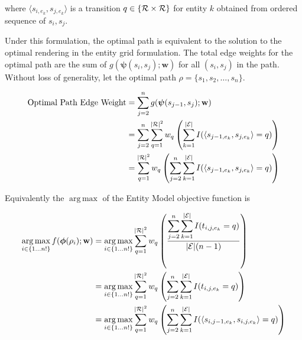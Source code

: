 \documentclass{article}
\newcommand{\entities}{{\cal E}}
\newcommand{\ent}{e}
\newcommand{\roles}{{\cal R}}
\newcommand{\tv}{t}
\newcommand{\sent}{s}
\newcommand{\weight}{\mathbf{w}}
\newcommand{\rend}{\rho}
\newcommand{\Rend}{{\cal P}}
\newcommand{\trans}{q}
\newcommand{\obj}{f}
\newcommand{\EnumS}[2]{\{#1 \ldots #2\}}
\DeclareMathOperator*{\argmax}{arg\,max}
\newcommand{\fmap}{\boldsymbol{\phi}}
\newcommand{\edgeTot}{\boldsymbol{\psi}}
\begin{document}
where $\langle \sent_{i,\ent_k},\sent_{j,\ent_k} \rangle$ is a transition $q \in \{\roles \times \roles\}$ for entity $k$  obtained from ordered sequence of $\sent_i,\sent_j$.


Under this formulation, the optimal path is equivalent to the solution to the optimal rendering in the entity grid formulation. 
The total edge weights for the optimal path are the sum of $g(\edgeTot(\sent_i,\sent_j);\weight)$ for all $(\sent_i,\sent_j)$ in the path.
Without loss of generality, let the optimal path $\rend = \{ \sent_1,\sent_2,\ldots,\sent_n \}$.

\begin{equation*}
\begin{split}
\textrm{Optimal Path Edge Weight} &= \sum^{n}_{j=2} g(\edgeTot(\sent_{j-1},\sent_j );\weight) \\
& = \sum^n_{j=2} \sum^{|\roles|^2}_{\trans=1} w_\trans \left( \sum_{k = 1}^{|\entities|} I(\langle \sent_{j-1,\ent_k},\sent_{j,\ent_k}\rangle = \trans)  \right)\\
& = \sum^{|\roles|^2}_{\trans=1} w_\trans \left( \sum^n_{j=2}  \sum_{k = 1}^{|\entities|} I(\langle \sent_{j-1,\ent_k},\sent_{j,\ent_k}\rangle = \trans)  \right)\\
\end{split}
\end{equation*}

Equivalently the $\argmax$ of the Entity Model objective function is


\begin{equation*}
\begin{split}
    \argmax_{i \in \EnumS{1}{n!}} \obj(\fmap(\rend_i) ; \weight ) &= \argmax_{i \in \EnumS{1}{n!}} \sum^{|\roles|^2}_{\trans=1} w_\trans \left(  \frac{ \displaystyle \sum_{j = 2}^n \sum_{k=1}^{|\entities|} I(\tv_{i,j,e_k}= \trans)  }{|\entities|(n-1)} \right)\\    
    &= \argmax_{i \in \EnumS{1}{n!}} \sum^{|\roles|^2}_{\trans=1} w_\trans \left( \displaystyle \sum_{j = 2}^n \sum_{k=1}^{|\entities|} I(\tv_{i,j,e_k}= \trans)\right)\\    
    &= \argmax_{i \in \EnumS{1}{n!}} \sum^{|\roles|^2}_{\trans=1} w_\trans \left( \displaystyle \sum_{j = 2}^n \sum_{k=1}^{|\entities|}I(\langle\sent_{i,j-1,\ent_k},\sent_{i,j,\ent_k} \rangle   = \trans)\right)\\    
\end{split}
\end{equation*} 





\end{document}
